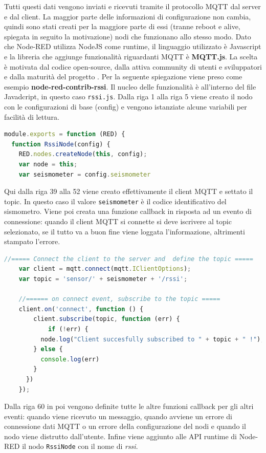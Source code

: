 \documentclass[a4paper,10pt]{memoir}
\begin{document}
Tutti questi dati vengono inviati e ricevuti tramite il protocollo MQTT dal server e dal client. La maggior parte delle informazioni di configurazione non cambia, quindi sono stati creati per la maggiore parte di essi (tranne reboot e alive, spiegata in seguito la motivazione) nodi che funzionano allo stesso modo.
Dato che Node-RED utilizza NodeJS come runtime, il linguaggio utilizzato è Javascript e la libreria che aggiunge funzionalità riguardanti MQTT è \textbf{MQTT.js}.
La scelta è motivata dal codice open-source, dalla attiva community di utenti e sviluppatori e dalla maturità del progetto \cite{mqttjs}.
Per la seguente spiegazione viene preso come esempio \textbf{node-red-contrib-rssi}.
Il nucleo delle funzionalità è all'interno del file Javadcript, in questo caso \texttt{rssi.js}.
Dalla riga 1 alla riga 5 viene creato il nodo con le configurazioni di base (config) e vengono istanziate alcune variabili per facilità di lettura.
\begin{lstlisting}[language=Javascript]
module.exports = function (RED) {
  function RssiNode(config) {
    RED.nodes.createNode(this, config);
    var node = this;
    var seismometer = config.seismometer
\end{lstlisting}
\clearpage
Qui dalla riga 39 alla 52 viene creato effettivamente il client MQTT e settato il topic. In questo caso il valore \texttt{seismometer} è il codice identificativo del sismometro.
Viene poi creata una funzione callback in risposta ad un evento di connessione: quando il client MQTT si connette si deve iscrivere al topic selezionato, se il tutto va a buon fine viene loggata l'informazione, altrimenti stampato l'errore.
\begin{lstlisting}[language=Javascript, firstnumber=39]
    //===== Connect the client to the server and  define the topic =====
    var client = mqtt.connect(mqtt.IClientOptions);
    var topic = 'sensor/' + seismometer + '/rssi';
    
    //====== on connect event, subscribe to the topic =====
    client.on('connect', function () {
        client.subscribe(topic, function (err) {
            if (!err) {
          node.log("Client succesfully subscribed to " + topic + " !");
        } else {
          console.log(err)
        }
      })
    });
\end{lstlisting}
Dalla riga 60 in poi vengono definite tutte le altre funzioni callback per gli altri eventi: quando viene ricevuto un messaggio, quando avviene un errore di connessione dati MQTT o un errore della configurazione del nodi e quando il nodo viene distrutto dall'utente. Infine viene aggiunto alle API runtime di Node-RED il nodo \texttt{RssiNode} con il nome di \textit{rssi}.
\end{document}
